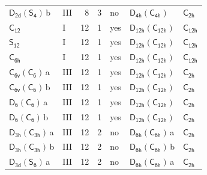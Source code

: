 \documentclass[10pt,a4paper]{article}
\numberwithin{equation}{section}
\newcommand{\grp}[1]{\mathsf{#1}}
\newcommand{\clsletter}[1]{\,{\scriptsize\color{black!55}#1}}
\begin{document}
{\begin{longtable}{@{}llrrlll@{}}
\href{D2d-S4.pdf}{$\grp{D_{2d}}(\grp{S_{4}})$}\clsletter{b} & III & 8 & 3 & no & \href{D4h-C4h.pdf}{$\grp{D_{4h}}(\grp{C_{4h}})$} & \href{../../../rotation/data/pdf/C2h.pdf}{$\grp{C_{2h}}$}\\
\href{../../../rotation/data/pdf/C12.pdf}{$\grp{C_{12}}$} & I & 12 & 1 & yes & \href{D12h-C12h.pdf}{$\grp{D_{12h}}(\grp{C_{12h}})$} & \href{../../../rotation/data/pdf/C12h.pdf}{$\grp{C_{12h}}$}\\
\href{../../../rotation/data/pdf/S12.pdf}{$\grp{S_{12}}$} & I & 12 & 1 & yes & \href{D12h-C12h.pdf}{$\grp{D_{12h}}(\grp{C_{12h}})$} & \href{../../../rotation/data/pdf/C12h.pdf}{$\grp{C_{12h}}$}\\
\href{../../../rotation/data/pdf/C6h.pdf}{$\grp{C_{6h}}$} & I & 12 & 1 & yes & \href{D12h-C12h.pdf}{$\grp{D_{12h}}(\grp{C_{12h}})$} & \href{../../../rotation/data/pdf/C12h.pdf}{$\grp{C_{12h}}$}\\
\href{C6v-C6.pdf}{$\grp{C_{6v}}(\grp{C_{6}})$}\clsletter{a} & III & 12 & 1 & yes & \href{D12h-C12h.pdf}{$\grp{D_{12h}}(\grp{C_{12h}})$} & \href{../../../rotation/data/pdf/C2h.pdf}{$\grp{C_{2h}}$}\\
\href{C6v-C6.pdf}{$\grp{C_{6v}}(\grp{C_{6}})$}\clsletter{b} & III & 12 & 1 & yes & \href{D12h-C12h.pdf}{$\grp{D_{12h}}(\grp{C_{12h}})$} & \href{../../../rotation/data/pdf/C2h.pdf}{$\grp{C_{2h}}$}\\
\href{D6-C6.pdf}{$\grp{D_{6}}(\grp{C_{6}})$}\clsletter{a} & III & 12 & 1 & yes & \href{D12h-C12h.pdf}{$\grp{D_{12h}}(\grp{C_{12h}})$} & \href{../../../rotation/data/pdf/C2h.pdf}{$\grp{C_{2h}}$}\\
\href{D6-C6.pdf}{$\grp{D_{6}}(\grp{C_{6}})$}\clsletter{b} & III & 12 & 1 & yes & \href{D12h-C12h.pdf}{$\grp{D_{12h}}(\grp{C_{12h}})$} & \href{../../../rotation/data/pdf/C2h.pdf}{$\grp{C_{2h}}$}\\
\href{D3h-C3h.pdf}{$\grp{D_{3h}}(\grp{C_{3h}})$}\clsletter{a} & III & 12 & 2 & no & \href{D6h-C6h.pdf}{$\grp{D_{6h}}(\grp{C_{6h}})$}\clsletter{a} & \href{../../../rotation/data/pdf/C2h.pdf}{$\grp{C_{2h}}$}\\
\href{D3h-C3h.pdf}{$\grp{D_{3h}}(\grp{C_{3h}})$}\clsletter{b} & III & 12 & 2 & no & \href{D6h-C6h.pdf}{$\grp{D_{6h}}(\grp{C_{6h}})$}\clsletter{b} & \href{../../../rotation/data/pdf/C2h.pdf}{$\grp{C_{2h}}$}\\
\href{D3d-S6.pdf}{$\grp{D_{3d}}(\grp{S_{6}})$}\clsletter{a} & III & 12 & 2 & no & \href{D6h-C6h.pdf}{$\grp{D_{6h}}(\grp{C_{6h}})$}\clsletter{a} & \href{../../../rotation/data/pdf/C2h.pdf}{$\grp{C_{2h}}$}\\

\end{longtable}}
\end{document}
